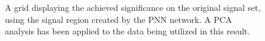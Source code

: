 \begin{figure}[H]
    \caption{A grid displaying the achieved significance on the original signal set, using the signal region 
    created by the \acs{PNN} network. A \acs{PCA} analysis has been applied to the data being utilized in this result.}
    \label{fig:PNNPCAGridSig}
\end{figure}

